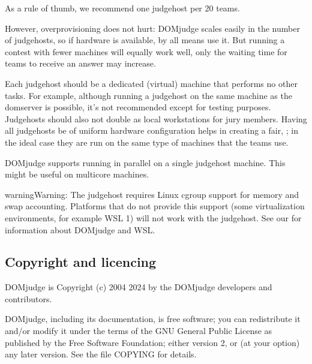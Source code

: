 \documentclass[a4paper,10pt,english,openany]{sphinxmanual}
\begin{document}
\sphinxAtStartPar
As a rule of thumb, we recommend one judgehost per 20 teams.

\sphinxAtStartPar
However, overprovisioning does not hurt: DOMjudge scales easily in the number
of judgehosts, so if hardware is available, by all means use it. But running a
contest with fewer machines will equally work well, only the waiting time for
teams to receive an answer may increase.

\sphinxAtStartPar
Each judgehost should be a dedicated (virtual) machine that performs no other
tasks. For example, although running a judgehost on the same machine as the
domserver is possible, it’s not recommended except for testing purposes.
Judgehosts should also not double as local workstations for jury members.
Having all judgehosts be of uniform hardware configuration helps in creating a
fair, {\hyperref[\detokenize{judging:judging-consistency}]{}}; in the ideal case
they are run on the same type of machines that the teams use.

\sphinxAtStartPar
DOMjudge supports running {\hyperref[\detokenize{config-advanced:multiple-judgedaemons}]{}}
in parallel on a single judgehost machine. This might be useful on multi\sphinxhyphen{}core
machines.

\begin{sphinxadmonition}{warning}{Warning:}
\sphinxAtStartPar
The judgehost requires Linux cgroup support for memory and swap accounting.
Platforms that do not provide this support (some virtualization environments,
for example WSL 1) will not work with the judgehost. See our  for information about DOMjudge and WSL.
\end{sphinxadmonition}


\subsection{Copyright and licencing}
\label{\detokenize{overview:copyright-and-licencing}}
\sphinxAtStartPar
DOMjudge is Copyright (c) 2004 \sphinxhyphen{} 2024 by the DOMjudge developers and contributors.

\sphinxAtStartPar
DOMjudge, including its documentation, is free software; you can redistribute
it and/or modify it under the terms of the GNU General Public License as
published by the Free Software Foundation; either version 2, or (at your
option) any later version. See the file COPYING for details.
\end{document}
